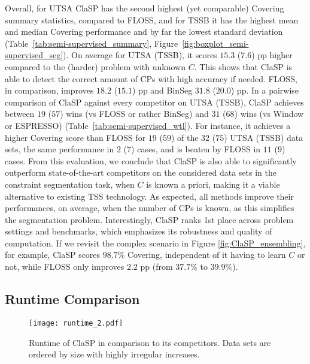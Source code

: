 \documentclass[pdflatex,sn-basic]{sn-jnl}
\begin{document}
Overall, for UTSA ClaSP has the second highest (yet comparable) Covering summary statistics, compared to FLOSS, and for TSSB it has the highest mean and median Covering performance and by far the lowest standard deviation (Table~\ref{tab:semi-supervised_summary}, Figure~\ref{fig:boxplot_semi-supervised_seg}). On average for UTSA (TSSB), it scores $15.3$ ($7.6$) pp higher compared to the (harder) problem with unknown $C$. This shows that ClaSP is able to detect the correct amount of CPs with high accuracy if needed. FLOSS, in comparison, improves $18.2$ ($15.1$) pp and BinSeg $31.8$ ($20.0$) pp. In a pairwise comparison of ClaSP against every competitor on UTSA (TSSB), ClaSP achieves between $19$ ($57$) wins (vs FLOSS or rather BinSeg) and $31$ ($68$) wins (vs Window or ESPRESSO) (Table~\ref{tab:semi-supervised_wtl}). For instance, it achieves a higher Covering score than FLOSS for $19$ ($59$) of the $32$ ($75$) UTSA (TSSB) data sets, the same performance in $2$ ($7$) cases, and is beaten by FLOSS in $11$ ($9$) cases. From this evaluation, we conclude that ClaSP is also able to significantly outperform state-of-the-art competitors on the considered data sets in the constraint segmentation task, when $C$ is known a priori, making it a viable alternative to existing TSS technology. As expected, all methods improve their performances, on average, when the number of CPs is known, as this simplifies the segmentation problem. Interestingly, ClaSP ranks 1st place across problem settings and benchmarks, which emphasizes its robustness and quality of computation. If we revisit the complex scenario in Figure \ref{fig:ClaSP_ensembling}, for example, ClaSP scores $98.7\%$ Covering, independent of it having to learn $C$ or not, while FLOSS only improves $2.2$ pp (from $37.7\%$ to $39.9\%$).


\subsection{Runtime Comparison} \label{sec:runtime}

\begin{figure}[t]
	\texttt{[image: runtime\_2.pdf]}
	\caption{Runtime of ClaSP in comparison to its competitors. Data sets are ordered by size with highly irregular increases.\label{fig:runtime}}
\end{figure}
\end{document}
